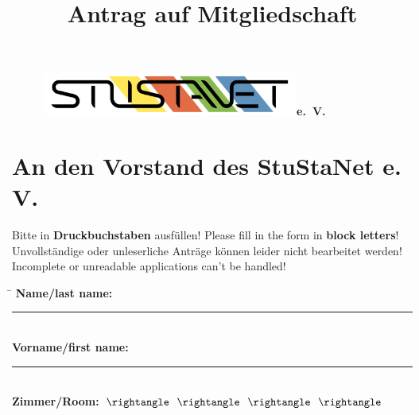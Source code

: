 \documentclass[a4paper,10pt]{scrartcl}
\title{Antrag auf Mitgliedschaft}
\date{}
\begin{document}

\maketitle
\vspace{-65pt}

\begin{figure}[t!]
   \centering
   \vspace{-40pt}
   \mbox{\includegraphics[width=0.75\textwidth,keepaspectratio]{StuStaNet_Logo}\Huge \sffamily \textbf{e. V.}}
   \vspace{-40pt}
\end{figure}


\section*{An den Vorstand des StuStaNet e. V.}






	\Large Bitte in \textbf{Druckbuchstaben} ausfüllen! Please fill in the form in \textbf{block letters}!\\
\large Unvollständige oder unleserliche Anträge können leider nicht bearbeitet werden!\\
Incomplete or unreadable applications can't be handled!


\vfill

{\Large
\begin{tabbing}
	\hspace{11em}\=\kill
	\bfseries Name/last name: \> \rule{12cm}{0.4pt}
	\\[1.3em]
	\bfseries Vorname/first name: \> \rule{12cm}{0.4pt}
	\\[1.3em]
        \bfseries Zimmer/Room: \>
	{\underline {\TextField[name=zimmer, bordercolor=white, width=2.4em, maxlen=4, borderwidth=0]{}}}
	{\color{gray} $\rightangle \hspace{.7em} \rightangle \hspace{.7em} \rightangle \hspace{.7em} \rightangle$} \\
\end{tabbing}
}
\vspace{-10pt}
\end{document}
